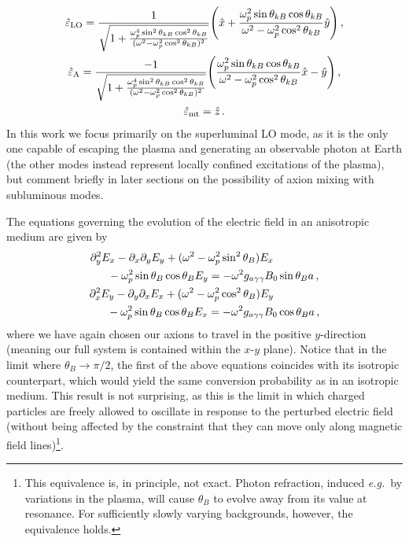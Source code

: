 \documentclass[twocolumn,superscriptaddress,floatfix,preprintnumbers,prd,nofootinbib,aps,10pt]{revtex4-2}
\renewcommand\({\left(}
\renewcommand\){\right)}
\renewcommand\[{\left[}
\renewcommand\]{\right]}
\newcommand\eg{{\it e.g.}~}
\begin{document}
%
\begin{gather}
    \hat{\varepsilon}_{\rm LO} = \frac{1}{\sqrt{1 + \frac{\omega_p^4 \sin^2 \theta_{kB} \cos^2 \theta_{kB}}{(\omega^2 - \omega_p^2 \cos^2 \theta_{kB})^2}}} \Bigg(\hat{x} + \frac{\omega_p^2 \sin \theta_{kB} \cos \theta_{kB}}{\omega^2 - \omega_p^2 \cos^2 \theta_{kB}} \hat{y}\Bigg) \, , \\
    \hat{\varepsilon}_{\rm A} = \frac{-1}{\sqrt{1 + \frac{\omega_p^4 \sin^2 \theta_{kB} \cos^2 \theta_{kB}}{(\omega^2 - \omega_p^2 \cos^2 \theta_{kB})^2}}} \Bigg(\frac{\omega_p^2 \sin \theta_{kB} \cos \theta_{kB}}{\omega^2 - \omega_p^2 \cos^2 \theta_{kB}} \hat{x} - \hat{y}\Bigg) \, , \\
    \hat{\varepsilon}_{\rm mt} = \hat{z} \, .
\end{gather}
%
In this work we focus primarily on the superluminal LO mode, as it is the only one capable of escaping the plasma and generating an observable photon at Earth (the other modes instead represent locally confined excitations of the plasma), but comment briefly in later sections on the possibility of axion mixing with subluminous modes. 

The equations governing the evolution of the electric field in an anisotropic medium are given by
%
\begin{gather}
    \multlinegap=16pt
    \begin{multlined}
        \partial_y^2 E_x - \partial_x\partial_y E_y + (\omega^2 - \omega_p^2 \sin^2 \theta_B) E_x \\
        - \omega_p^2 \sin\theta_B \cos\theta_B E_y = - \omega^2 g_{a\gamma\gamma} B_0 \sin\theta_B a \, , \label{eq:coupled_aniso1}
    \end{multlined} \\
    \multlinegap=16pt
    \begin{multlined}\label{eq:coupled_aniso2}
        \partial_x^2 E_y - \partial_y\partial_x E_x + (\omega^2 - \omega_p^2 \cos^2 \theta_B) E_y \\
        - \omega_p^2 \sin\theta_B \cos\theta_B E_x = - \omega^2 g_{a\gamma\gamma} B_0 \cos\theta_B a \, ,
    \end{multlined}
\end{gather}
%
where we have again chosen our axions to travel in the positive $y$-direction (meaning our full system is contained within the $x$-$y$ plane). Notice that in the limit where $\theta_{B} \rightarrow \pi/2$, the first of the above equations coincides with its isotropic counterpart, which would yield the same conversion probability as in an isotropic medium. This result is not surprising, as this is the limit in which charged particles are freely allowed to oscillate in response to the perturbed electric field (without being affected by the constraint that they can move only along magnetic field lines)\footnote{This equivalence is, in principle, not exact. Photon refraction, induced \eg by variations in the plasma, will cause $\theta_B$ to evolve away from its value at resonance. For sufficiently slowly varying backgrounds, however, the equivalence holds.}. 
\end{document}
